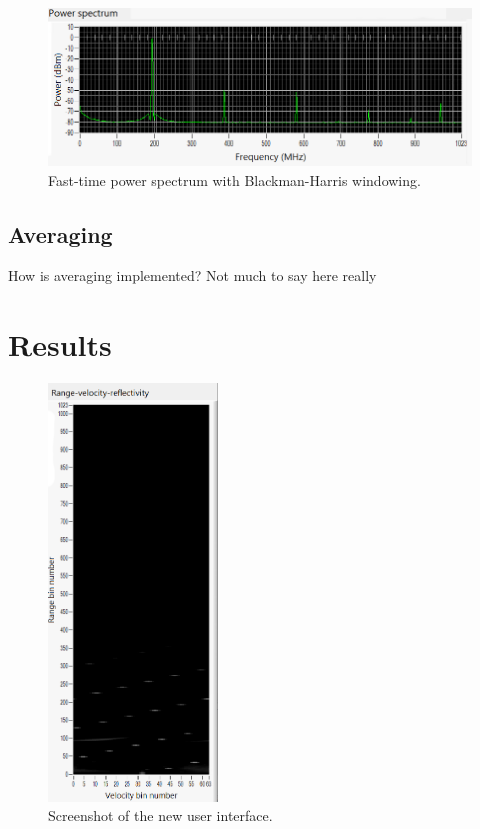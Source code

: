\documentclass{article}
\begin{document}
\begin{figure}
	\centering
	\includegraphics[width=\textwidth]{window-bmh}
	\caption{Fast-time power spectrum with Blackman-Harris windowing.}
	\label{fig:WindowBMH}
\end{figure}

\subsection{Averaging}
How is averaging implemented? Not much to say here really

\section{Results}

\begin{figure}
	\centering
	\includegraphics[width=0.4\textwidth]{working-cloud_range-doppler}
	\caption{Screenshot of the new user interface.}
	\label{fig:WorkingCloudRangeDoppler}
\end{figure}
\end{document}
